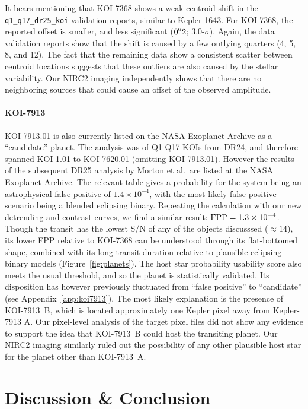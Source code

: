 \documentclass[12pt,twocolumn]{aastex63}
\begin{document}
It bears mentioning that KOI-7368 shows a weak centroid shift in the
\texttt{q1\_q17\_dr25\_koi} validation reports, similar to
Kepler-1643.  For KOI-7368, the reported offset is smaller, and less
significant ($0\mbox{$.\!\!^{\prime\prime}$}2$; 3.0-$\sigma$).  Again, the data
validation reports show that the shift is caused by a few outlying
quarters (4, 5, 8, and 12).  The fact that the remaining data show a
consistent scatter between centroid locations suggests that these
outliers are also caused by the stellar variability.  
Our NIRC2 imaging independently shows that there are no neighboring
sources that could cause an offset of the observed amplitude.

\paragraph{KOI-7913}
KOI-7913.01 is also currently listed on the NASA Exoplanet Archive as a
``candidate'' planet.  The \citet{morton_false_2016}
analysis was of Q1-Q17 KOIs from DR24, and therefore spanned KOI-1.01
to KOI-7620.01 (omitting KOI-7913.01).  However the results of the
subsequent DR25 analysis by Morton et al.\ are listed at the NASA
Exoplanet Archive.  The relevant table gives a probability for the
system being an astrophysical false positive of $1.4\times10^{-4}$,
with the most likely false positive scenario being a blended eclipsing
binary.  Repeating the calculation with our new detrending and
contrast curves, we find a similar result: ${\rm FPP} =
1.3\times10^{-4}$.  Though the transit has the lowest S/N of any of
the objects discusssed ($\approx$$14$), its lower FPP relative to
KOI-7368 can be understood through its flat-bottomed shape,
combined with its long transit duration relative to plausible
eclipsing binary models (Figure~\ref{fig:planets}).  The host star
probability usability score \citep{2017ksci.rept...16B} also meets the
usual threshold, and so the planet is statistically validated.  Its
disposition has however previously fluctuated from ``false positive''
to ``candidate'' (see Appendix~\ref{app:koi7913}).  The most likely
explanation is the presence of KOI-7913~B, which is located
approximately one Kepler pixel away from Kepler-7913 A.  Our
pixel-level analysis of the target pixel files did not show any
evidence to support the idea that KOI-7913~B could host the transiting
planet.  Our NIRC2 imaging similarly ruled out the possibility of any
other plausible host star for the planet other than KOI-7913~A.


\section{Discussion \& Conclusion}
\label{sec:disc_conc}
\end{document}
